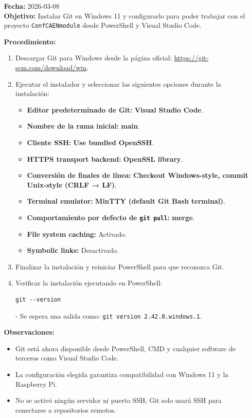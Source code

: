 \documentclass{article}
\begin{document}
\textbf{Fecha:} 2026-03-08 \\
\textbf{Objetivo:} Instalar Git en Windows 11 y configurarlo para poder trabajar con el proyecto \texttt{ConfCAENmodule} desde PowerShell y Visual Studio Code.

\textbf{Procedimiento:}

\begin{enumerate}
    \item Descargar Git para Windows desde la página oficial: \url{https://git-scm.com/download/win}.
    
    \item Ejecutar el instalador y seleccionar las siguientes opciones durante la instalación:
    \begin{itemize}
        \item \textbf{Editor predeterminado de Git:} \textbf{Visual Studio Code}.
        \item \textbf{Nombre de la rama inicial:} \textbf{main}.
        \item \textbf{Cliente SSH:} \textbf{Use bundled OpenSSH}.
        \item \textbf{HTTPS transport backend:} \textbf{OpenSSL library}.
        \item \textbf{Conversión de finales de línea:} \textbf{Checkout Windows-style, commit Unix-style (CRLF → LF)}.
        \item \textbf{Terminal emulator:} \textbf{MinTTY (default Git Bash terminal)}.
        \item \textbf{Comportamiento por defecto de \texttt{git pull}:} \textbf{merge}.
        \item \textbf{File system caching:} Activado.
        \item \textbf{Symbolic links:} Desactivado.
    \end{itemize}

    \item Finalizar la instalación y reiniciar PowerShell para que reconozca Git.
    
    \item Verificar la instalación ejecutando en PowerShell:
    \begin{verbatim}
git --version
    \end{verbatim}
    - Se espera una salida como: \texttt{git version 2.42.0.windows.1}.
\end{enumerate}

\textbf{Observaciones:}
\begin{itemize}
    \item Git está ahora disponible desde PowerShell, CMD y cualquier software de terceros como Visual Studio Code.
    \item La configuración elegida garantiza compatibilidad con Windows 11 y la Raspberry Pi.
    \item No se activó ningún servidor ni puerto SSH; Git solo usará SSH para conectarse a repositorios remotos.
\end{itemize}
\end{document}
